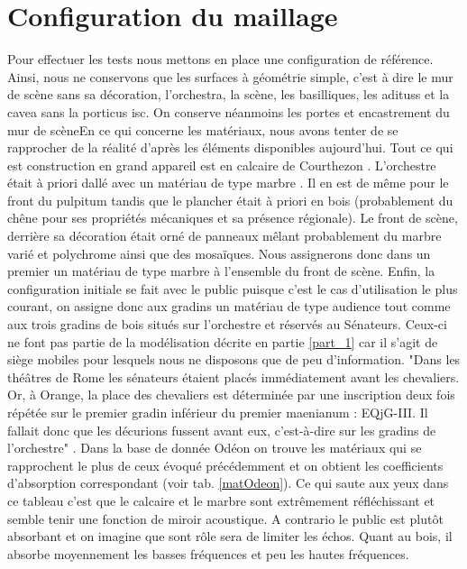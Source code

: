 	\section{Configuration du maillage}
Pour effectuer les tests nous mettons en place une configuration de référence.	Ainsi, nous ne conservons que les surfaces à géométrie simple, c'est à dire le mur de scène sans sa décoration, l'\gls{orchestra}, la scène, les basilliques, les \glspl{aditus} et la \gls{cavea} sans la \gls{porticus isc}. On conserve néanmoins les portes et encastrement du mur de scèneEn ce qui concerne les matériaux, nous avons tenter de se rapprocher de la réalité d'après les éléments disponibles aujourd'hui. Tout ce qui est construction en grand appareil est en calcaire de Courthezon \cite[p.43]{orangeTxt}. L'orchestre était à priori dallé avec un matériau de type marbre \cite[p.337]{orangeTxt}. Il en est de même pour le front du \gls{pulpitum} tandis que le plancher était à priori en bois (probablement du chêne pour ses propriétés mécaniques et sa présence régionale). Le front de scène, derrière sa décoration était orné de panneaux mêlant probablement du marbre varié et polychrome ainsi que des mosaïques. Nous assignerons donc dans un premier un matériau de type marbre à l'ensemble du front de scène. Enfin, la configuration initiale se fait avec le public puisque c'est le cas d'utilisation le plus courant, on assigne donc aux gradins un matériau de type audience tout comme aux trois gradins de bois situés sur l'orchestre et réservés au Sénateurs. Ceux-ci ne font pas partie de la modélisation décrite en partie \ref{part_1} car il s'agit de siège mobiles pour lesquels nous ne disposons que de peu d'information. "Dans les théâtres de Rome les sénateurs étaient placés immédiatement avant les chevaliers. Or, à Orange, la place des chevaliers est déterminée par une inscription deux fois répétée sur le premier gradin inférieur du premier \gls{maenianum} : EQjG-III. Il fallait donc que les décurions fussent avant eux, c'est-à-dire sur les gradins de l'orchestre" \cite[p.46]{formige}. Dans la base de donnée Odéon \cite[materials]{odeon} on trouve les matériaux qui se rapprochent le plus de ceux évoqué précédemment et on obtient les coefficients d'absorption correspondant (voir tab. \ref{matOdeon}). Ce qui saute aux yeux dans ce tableau c'est que le calcaire et le marbre sont extrêmement réfléchissant et semble tenir une fonction de miroir acoustique. A contrario le public est plutôt absorbant et on imagine que sont rôle sera de limiter les échos. Quant au bois, il absorbe moyennement les basses fréquences et peu les hautes fréquences.
